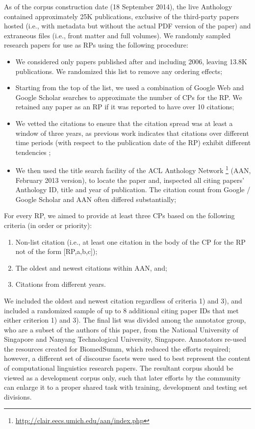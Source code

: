 \documentclass[11pt]{article}
\begin{document}
As of the corpus construction date (18 September 2014), the live
Anthology contained approximately 25K publications, exclusive of the
third-party papers hosted (i.e., with metadata but without the actual
PDF version of the paper) and extraneous files (i.e., front matter and
full volumes). We randomly sampled research papers for use as RPs
using the following procedure:
\begin{itemize}
\item{We considered only papers published after and including 2006,
  leaving 13.8K publications. We randomized this list to remove any
  ordering effects;}
\vspace{-.3cm}
\item{Starting from the top of the list, we used a combination of
  Google Web and Google Scholar searches to approximate the number of
  CPs for the RP.  We retained any paper as an RP if it was reported
  to have over 10 citations;}
\vspace{-.3cm}
\item{We vetted the citations to ensure that the citation spread was at least a 
window of three years, as previous work indicates that citations over different 
time periods (with respect to the publication date of the RP) exhibit different 
tendencies \cite{N13-1067};}
\vspace{-.3cm}
\item{We then used the title search facility of the ACL Anthology Network
\footnote{\url{http://clair.eecs.umich.edu/aan/index.php}} (AAN, February 2013 version), 
  to locate the paper and, inspected all citing papers' Anthology ID, title and year of
  publication. The citation count from Google / Google Scholar and AAN often differed 
  substantially;}
\end{itemize}
For every RP, we aimed to provide at least three CPs based on the following 
criteria (in order or priority):
\begin{enumerate}
\item Non-list citation (i.e., at least one citation in the body of
  the CP for the RP not of the form [RP,a,b,c]);
\vspace{-.3cm}
\item The oldest and newest citations within AAN, and;
\vspace{-.3cm}
\item Citations from different years. 
\end{enumerate}

We included the oldest and newest citation regardless of criteria 1)
and 3), and included a randomized sample of up to 8 additional citing
paper IDs that met either criterion 1) and 3). The final list was
divided among the annotator group, who are a subset of the authors of
this paper, from the National University of Singapore and Nanyang
Technological University, Singapore. Annotators re-used the resources
created for BiomedSumm, which reduced the efforts required; however, a
different set of discourse facets were used to best represent the
content of computational linguistics research papers.  The resultant
corpus should be viewed as a development corpus only, such that later
efforts by the community can enlarge it to a proper shared task with
training, development and testing set divisions.
\end{document}
